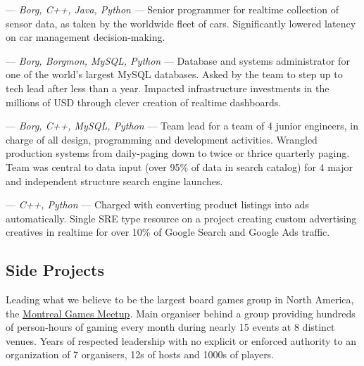 \begin{langen}
\begin{description}%
\vspace{2 mm}
\item[Street View] --- \textit{Borg, C++, Java, Python} --- Senior programmer for realtime collection of sensor data, as taken by the worldwide fleet of cars. Significantly lowered latency on car management decision-making.
\item[Ads-SRE-DB] --- \textit{Borg, Borgmon, MySQL, Python} --- Database and systems administrator for one of the world's largest MySQL databases. Asked by the team to step up to tech lead after less than a year. Impacted infrastructure investments in the millions of USD through clever creation of realtime dashboards.
\item [Froogle \& Google Base] --- \textit{Borg, C++, MySQL, Python} --- Team lead for a team of 4 junior engineers, in charge of all design, programming and development activities. Wrangled production systems from daily-paging down to twice or thrice quarterly paging. Team was central to data input (over 95\% of data in search catalog) for 4 major and independent structure search engine launches.
\item[Ads/Deli] --- \textit{C++, Python} --- Charged with converting product listings into ads automatically. Single SRE type resource on a project creating custom advertising creatives in realtime for over 10\% of Google Search and Google Ads traffic.
\end{description}
\end{langen}

\begin{langen}
\section{Side Projects}
\end{langen}

\begin{langen}
Leading what we believe to be the largest board games group in North America, the \href{https://www.meetup.com/montreal-games-meetup/}{Montreal Games Meetup}. Main organiser behind a group providing hundreds of person-hours of gaming every month during nearly 15 events at 8 distinct venues. Years of respected leadership with no explicit or enforced authority to an organization of 7 organisers, 12s of hosts and 1000s of players.
\end{langen}


